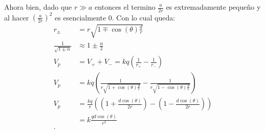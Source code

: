 \begin{enumerate}
      Ahora bien, dado que $r \gg a$ entonces el termino $\frac{a}{2r}$ es extremadamente pequeño y al hacer $\left( \frac{a}{2r} \right)^2$ es esencialmente 0. Con lo cual queda:
      \begin{align*}
        r_{\pm} &= r \sqrt{1 \mp \cos\left( \theta \right) \frac{d}{r}}  \\
	\frac{1}{\sqrt{1 \pm \alpha} } &\approx 1 \pm \frac{\alpha}{2}\\
        V_p &= V_{+} + V_{-} = kq\left( \frac{1}{r_+} - \frac{1}{r_-} \right)  \\
        V_p &= kq\left( \frac{1}{r \sqrt{1 + \cos\left( \theta \right) \frac{d}{r}}} - \frac{1}{r \sqrt{1 - \cos\left( \theta \right) \frac{d}{r}}} \right)  \\
	V_p &= \frac{kq}{r} \left(\left( 1 + \frac{d\cos\left( \theta \right) }{2r} \right) - \left( 1 - \frac{d\cos\left( \theta \right) }{2r} \right)  \right)  \\
	&= k \frac{qd\cos\left( \theta \right) }{r^2} \\
      .\end{align*}


\end{enumerate}
